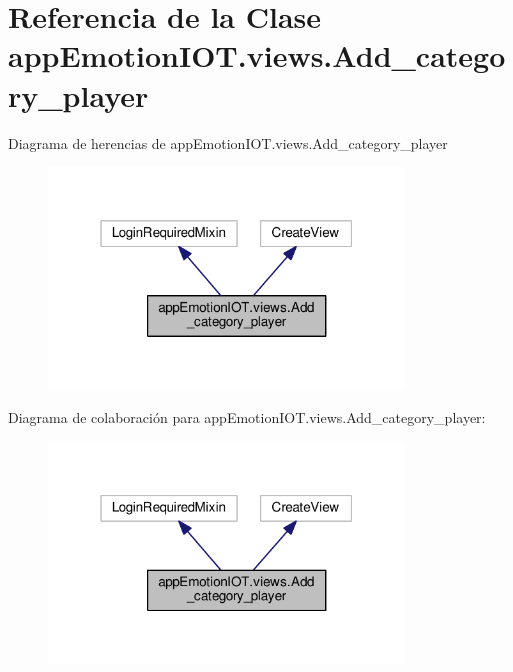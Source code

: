 \hypertarget{classappEmotionIOT_1_1views_1_1Add__category__player}{}\section{Referencia de la Clase app\+Emotion\+I\+O\+T.\+views.\+Add\+\_\+category\+\_\+player}
\label{classappEmotionIOT_1_1views_1_1Add__category__player}


Diagrama de herencias de app\+Emotion\+I\+O\+T.\+views.\+Add\+\_\+category\+\_\+player
\nopagebreak
\begin{figure}[H]
\begin{center}
\leavevmode
\includegraphics[width=268pt]{classappEmotionIOT_1_1views_1_1Add__category__player__inherit__graph}
\end{center}
\end{figure}


Diagrama de colaboración para app\+Emotion\+I\+O\+T.\+views.\+Add\+\_\+category\+\_\+player\+:
\nopagebreak
\begin{figure}[H]
\begin{center}
\leavevmode
\includegraphics[width=268pt]{classappEmotionIOT_1_1views_1_1Add__category__player__coll__graph}
\end{center}
\end{figure}

